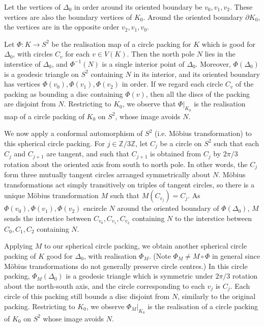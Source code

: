 \documentclass[12pt]{amsart}
\numberwithin{equation}{section}
\theoremstyle{named}
\newcommand{\Z}{\mathbb{Z}}
\newcommand{\To}{\longrightarrow}
\begin{document}
Let the vertices of $\Delta_0$ in order around its oriented boundary be $v_0, v_1, v_2$. These vertices are also the boundary vertices of $K_0$. Around the oriented boundary $\partial K_0$, the vertices are in the opposite order $v_2,v_1,v_0$.

Let $\Phi \colon K \To S^2$ be the realisation map of a circle packing for $K$ which is good for $\Delta_0$, with circles $C_v$ for each $v \in V(K)$. Then the north pole $N$ lies in the interstice of $\Delta_0$, and $\Phi^{-1}(N)$ is a single interior point of $\Delta_0$. Moreover, $\Phi(\Delta_0)$ is a geodesic triangle on $S^2$ containing $N$ in its interior, and its oriented boundary has vertices $\Phi(v_0), \Phi(v_1), \Phi(v_2)$ in order. If we regard each circle $C_v$ of the packing as bounding a disc containing $\Phi(v)$, then all the discs of the packing are disjoint from $N$. Restricting to $K_0$, we observe that $\Phi|_{K_0}$ is the realisation map of a circle packing of $K_0$ on $S^2$, whose image avoids $N$. 

We now apply a conformal automorphism of $S^2$ (i.e. M\"{o}bius transformation) to this spherical circle packing. For $j \in \Z/3\Z$, let $C_j$ be a circle on $S^2$ such that each $C_j$ and $C_{j+1}$ are tangent, and such that $C_{j+1}$ is obtained from $C_j$ by $2\pi/3$ rotation about the oriented axis from south to north pole. In other words, the $C_j$ form three mutually tangent circles arranged symmetrically about $N$. M\"{o}bius transformations act simply transitively on triples of tangent circles, so there is a unique M\"{o}bius transformation $M$ such that $M(C_{v_j}) = C_j$. As $\Phi(v_0), \Phi(v_1), \Phi(v_2)$ encircle $N$ around the oriented boundary of $\Phi(\Delta_0)$, $M$ sends the interstice between $C_{v_0}, C_{v_1}, C_{v_2}$ containing $N$ to the interstice between $C_0, C_1, C_2$ containing $N$. 

Applying $M$ to our spherical circle packing, we obtain another spherical circle packing of $K$ good for $\Delta_0$, with realisation $\Phi_M$. (Note $\Phi_M \neq M \circ \Phi$ in general since M\"{o}bius transformations do not generally preserve circle centres.) In this circle packing, $\Phi_M (\Delta_0)$ is a geodesic triangle which is symmetric under $2\pi/3$ rotation about the north-south axis, and the circle corresponding to each $v_j$ is $C_j$. Each circle of this packing still bounds a disc disjoint from $N$, similarly to the original packing. Restricting to $K_0$, we observe $\Phi_M|_{K_0}$ is the realisation of a circle packing of $K_0$ on $S^2$ whose image avoids $N$.
\end{document}
